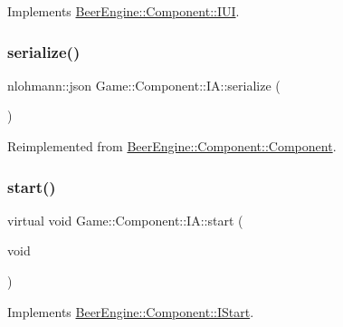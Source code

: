 Implements \mbox{\hyperlink{class_beer_engine_1_1_component_1_1_i_u_i_a4a049b1749c1bce80e1fd63538e9fae3}{Beer\+Engine\+::\+Component\+::\+I\+UI}}.

\mbox{\label{class_game_1_1_component_1_1_i_a_a3d5af6c25e457a246fac8cbd63764223}} 
\subsubsection{\texorpdfstring{serialize()}{serialize()}}
{\footnotesize\ttfamily nlohmann\+::json Game\+::\+Component\+::\+I\+A\+::serialize (\begin{DoxyParamCaption}{ }\end{DoxyParamCaption})\hspace{0.3cm}{\ttfamily [virtual]}}



Reimplemented from \mbox{\hyperlink{class_beer_engine_1_1_component_1_1_component_a4d82d8a6b22b93514e0585fa4073041f}{Beer\+Engine\+::\+Component\+::\+Component}}.

\mbox{\label{class_game_1_1_component_1_1_i_a_ab440dc76a8837e291f6545e0dd15c819}} 
\subsubsection{\texorpdfstring{start()}{start()}}
{\footnotesize\ttfamily virtual void Game\+::\+Component\+::\+I\+A\+::start (\begin{DoxyParamCaption}\item[{void}]{ }\end{DoxyParamCaption})\hspace{0.3cm}{\ttfamily [virtual]}}



Implements \mbox{\hyperlink{class_beer_engine_1_1_component_1_1_i_start_aa3e25e86e20c46cdaefc6f6d7f21e495}{Beer\+Engine\+::\+Component\+::\+I\+Start}}.

\mbox{\label{class_game_1_1_component_1_1_i_a_a5890e0da2fb55d58868c0cd441c33dc4}} 
